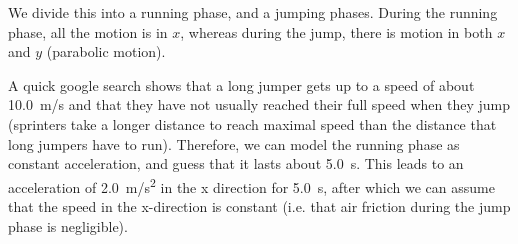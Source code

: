 \begin{finalanswer}
\end{finalanswer}
\begin{solution}
We divide this into a running phase, and a jumping phases. During the running phase, all the motion is in $x$, whereas during the jump, there is motion in both $x$ and $y$ (parabolic motion).

A quick google search shows that a long jumper gets up to a speed of about \SI{10.0}{m/s} and that they have not usually reached their full speed when they jump (sprinters take a longer distance to reach maximal speed than the distance that long jumpers have to run). Therefore, we can model the running phase as constant acceleration, and guess that it lasts about \SI{5.0}{s}. This leads to an acceleration of \SI{2.0}{m/s^2} in the x direction for \SI{5.0}{s}, after which we can assume that the speed in the x-direction is constant (i.e. that air friction during the jump phase is negligible).


\end{solution}
